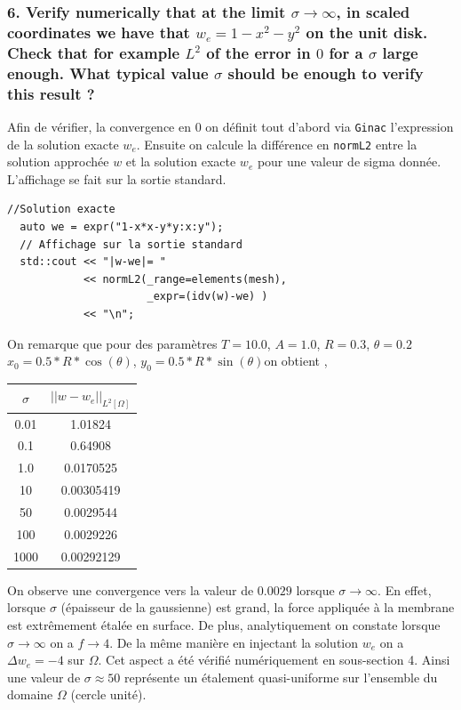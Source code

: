 \documentclass[a4paper,oneside,10pt]{report}
\begin{document}
\subsubsection{6. Verify numerically that at the limit $\sigma \rightarrow \infty$, in scaled coordinates we have that $w_e = 1 - x^2 - y^2$ on the unit disk. Check that for example $L^2$ of the error in $0$ for a $\sigma$ large enough. What typical value $\sigma$ should be enough to verify this result ?}
Afin de vérifier, la convergence en $0$ on définit tout d'abord via \texttt{Ginac} l'expression de la solution exacte $w_e$. Ensuite on calcule la différence en \texttt{normL2} entre la solution approchée $w$ et la solution exacte $w_e$ pour une valeur de sigma donnée. L'affichage se fait sur la sortie standard.
\begin{center}
\begin{minipage}{\textwidth}
\begin{lstlisting}[label=code2,caption=membrane.cpp - Calcul de la différence en norme L2]
  //Solution exacte
  auto we = expr("1-x*x-y*y:x:y");
  // Affichage sur la sortie standard
  std::cout << "|w-we|= "
            << normL2(_range=elements(mesh),
                      _expr=(idv(w)-we) )
            << "\n";
 \end{lstlisting}
\end{minipage}
\end{center}
On remarque que pour des paramètres $T=10.0$, $A = 1.0$, $R = 0.3$, $\theta = 0.2$ $x_0 = 0.5*R*\cos(\theta)$, $y_0 = 0.5*R*\sin(\theta)$on obtient ,
\begin{center}
\begin{tabular}{|c|c|}
  \hline
  $\sigma$ &  $||w-w_e||_{L^2[\Omega]}$ \\
  \hline
  0.01 &  1.01824  \\
  0.1 & 0.64908 \\
  1.0 & 0.0170525 \\
  10 &  0.00305419\\
  50 & 0.0029544\\
  100 & 0.0029226\\
  1000 & 0.00292129\\
   \hline
\end{tabular}
\end{center}
On observe une convergence vers la valeur de $0.0029$ lorsque $\sigma \rightarrow \infty$. En effet, lorsque $\sigma$ (épaisseur de la gaussienne) est grand, la force appliquée à la membrane est extrêmement étalée en surface. De plus, analytiquement on constate lorsque $\sigma \rightarrow \infty$ on a $f \rightarrow  4$. De la même manière en injectant la solution $w_e$ on a $\Delta w_e = -4$ sur $\Omega$. Cet aspect a été vérifié numériquement en sous-section 4.  Ainsi une valeur de $\sigma\approx 50$ représente un étalement quasi-uniforme sur l'ensemble du domaine $\Omega$ (cercle unité).
\end{document}

